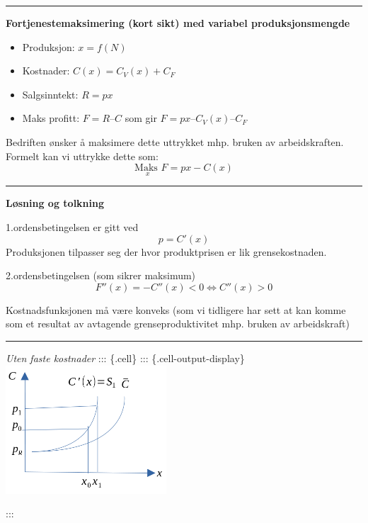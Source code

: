 \documentclass[
  letterpaper,
  DIV=11,
  numbers=noendperiod]{scrartcl}
\providecommand{\tightlist}{%
  \setlength{\itemsep}{0pt}\setlength{\parskip}{0pt}}\usepackage{longtable,booktabs,array}
\begin{document}
\begin{center}\rule{0.5\linewidth}{0.5pt}\end{center}

\textbf{Fortjenestemaksimering (kort sikt) med variabel
produksjonsmengde}

\begin{itemize}
\tightlist
\item
  Produksjon: \(x = f(N)\)
\item
  Kostnader: \(C(x) = C_V(x) + C_F\)
\item
  Salgsinntekt: \(R = px\)
\item
  Maks profitt: \(F = R – C\) som gir \(F=px – C_V(x) – C_F\)
\end{itemize}

Bedriften ønsker å maksimere dette uttrykket mhp. bruken av
arbeidskraften. Formelt kan vi uttrykke dette som: \[
\underset{x}{\text{Maks }} F=px-C(x)
\]

\begin{center}\rule{0.5\linewidth}{0.5pt}\end{center}

\textbf{Løsning og tolkning}

1.ordensbetingelsen er gitt ved \[
p = C'(x)
\] Produksjonen tilpasser seg der hvor produktprisen er lik
grensekostnaden.

2.ordensbetingelsen (som sikrer maksimum) \[
F''(x)=-C''(x) < 0 \Leftrightarrow C''(x) > 0 
\]

Kostnadsfunksjonen må være konveks (som vi tidligere har sett at kan
komme som et resultat av avtagende grenseproduktivitet mhp. bruken av
arbeidskraft)

\begin{center}\rule{0.5\linewidth}{0.5pt}\end{center}

\emph{Uten faste kostnader} ::: \{.cell\} ::: \{.cell-output-display\}
\includegraphics[width=0.45\textwidth,height=\textheight]{drawio/kgkufast.png}

:::
\end{document}
